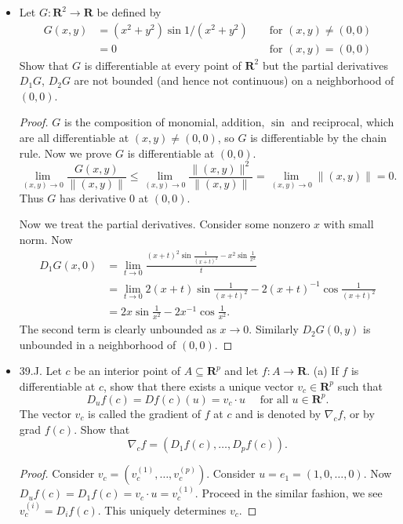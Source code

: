 \begin{itemize}
\item [39.G.] Let $G: \boldsymbol{R}^2 \rightarrow \boldsymbol{R}$ be defined by
\[
\begin{aligned}
G(x, y) & =\left(x^2+y^2\right) \sin 1 /\left(x^2+y^2\right) & & \text { for }(x, y) \neq(0,0) \\
& =0 & & \text { for }(x, y)=(0,0)
\end{aligned}
\]
Show that $G$ is differentiable at every point of $\boldsymbol{R}^2$ but the partial derivatives $D_1 G$, $D_2 G$ are not bounded (and hence not continuous) on a neighborhood of $(0,0)$.
\begin{proof}
	$G$ is the composition of monomial, addition, $\sin$ and reciprocal, which are all differentiable at $(x, y)\neq (0,0)$, so $G$ is differentiable by the chain rule. Now we prove $G$ is differentiable at $(0,0)$. 
	\[
		\lim_{(x,y) \to 0} \frac{G(x, y)}{\|(x,y)\|} 
		\le  \lim_{(x,y) \to 0} \frac{\|(x,y)\|^2}{\|(x,y)\|} 
		= \lim_{(x,y) \to 0} \|(x,y)\| = 0
	.\] 
	Thus $G$ has derivative $0$ at $(0,0)$.

	Now we treat the partial derivatives. Consider some nonzero $x$ with small norm. Now
	\begin{align*}
		D_1G(x, 0) &= \lim_{t \to 0} \frac{(x+t)^2 \sin \frac{1}{(x+t)^2} - x^2 \sin \frac{1}{x^2}}{t}\\
			   &= \lim_{t \to 0} 2(x+t) \sin \frac{1}{(x+t)^2} -2 (x+t)^{-1} \cos \frac{1}{(x+t)^2}\\
			   &= 2x \sin \frac{1}{x^2} - 2x^{-1} \cos \frac{1}{x^2}
	.\end{align*} 
	The second term is clearly unbounded as $x \to  0.$ Similarly $D_2G(0, y)$ is unbounded in a neighborhood of $(0,0)$.
\end{proof}

\item 39.J. Let $c$ be an interior point of $A \subseteq \boldsymbol{R}^p$ and let $f: A \rightarrow \boldsymbol{R}$.
(a) If $f$ is differentiable at $c$, show that there exists a unique vector $v_c \in \boldsymbol{R}^p$ such that
\[
D_u f(c)=D f(c)(u)=v_c \cdot u \quad \text { for all } u \in \boldsymbol{R}^p .
\]
The vector $v_c$ is called the gradient of $f$ at $c$ and is denoted by $\nabla_c f$, or by grad $f(c)$. Show that
\[
\nabla_c f=\left(D_1 f(c), \ldots, D_p f(c)\right) .
\]
\begin{proof}
	Consider $v_c = (v_c^{(1)}, \ldots, v_c^{(p)})$. Consider $u = e_1 = (1,0,\ldots, 0)$. Now $D_uf(c) = D_1f(c) = v_c \cdot u = v_c^{(1)}$. Proceed in the similar fashion, we see $v_c^{(i)} = D_i f(c)$. This uniquely determines $v_c$. 


\end{proof}
\end{itemize}
